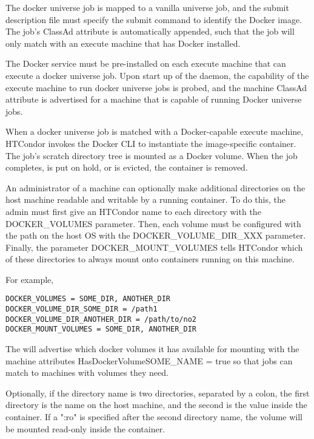 The docker universe job is mapped to a vanilla universe job,
and the submit description file must specify 
the submit command  to identify the Docker image.
The job's  ClassAd attribute is automatically appended,
such that the job will only match with an execute machine 
that has Docker installed.

The Docker service must be pre-installed on each execute machine
that can execute a docker universe job.
Upon start up of the  daemon,
the capability of the execute machine to run docker universe jobs is probed, 
and the machine ClassAd attribute  is advertised
for a machine that is capable of running Docker universe jobs.

When a docker universe job is matched with a Docker-capable
execute machine,
HTCondor invokes the Docker CLI to instantiate the image-specific container.
The job's scratch directory tree is mounted as a Docker volume.
When the job completes, is put on hold, or is evicted, the container is removed.

An administrator of a machine can optionally make additional directories
on the host machine readable and writable by a running container.
To do this, the admin must first give an HTCondor name to each directory
with the DOCKER\_VOLUMES parameter.  Then, each volume must be configured
with the path on the host OS with the DOCKER\_VOLUME\_DIR\_XXX parameter.
Finally, the parameter DOCKER\_MOUNT\_VOLUMES tells HTCondor which of
these directories to always mount onto containers running on this machine.

For example,
\begin{verbatim}
DOCKER_VOLUMES = SOME_DIR, ANOTHER_DIR
DOCKER_VOLUME_DIR_SOME_DIR = /path1
DOCKER_VOLUME_DIR_ANOTHER_DIR = /path/to/no2
DOCKER_MOUNT_VOLUMES = SOME_DIR, ANOTHER_DIR
\end{verbatim}

The  will advertise which docker volumes it has available 
for mounting with the machine attributes HasDockerVolumeSOME\_NAME = true
so that jobs can match to machines with volumes they need.

Optionally, if the directory name is two directories, separated by a colon,
the first directory is the name on the host machine, and the second is the
value inside the container.  If a ":ro" is specified after the second directory
name, the volume will be mounted read-only inside the container.

